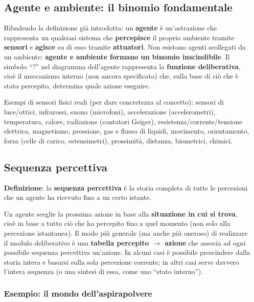 \documentclass[11pt,a4paper]{report}
\begin{document}
\subsection{Agente e ambiente: il binomio fondamentale}

Ribadendo la definizione già introdotta: un \textbf{agente} è un'astrazione che rappresenta un qualsiasi sistema che \textbf{percepisce} il proprio ambiente tramite \textbf{sensori} e \textbf{agisce} su di esso tramite \textbf{attuatori}. Non esistono agenti scollegati da un ambiente: \textbf{agente e ambiente formano un binomio inscindibile}. Il simbolo ``?'' nel diagramma dell'agente rappresenta la \textbf{funzione deliberativa}, cioè il meccanismo interno (non ancora specificato) che, sulla base di ciò che è stato percepito, determina quale azione eseguire.

Esempi di sensori fisici reali (per dare concretezza al concetto): sensori di luce/ottici, infrarossi, suono (microfoni), accelerazione (accelerometri), temperatura, calore, radiazione (contatori Geiger), resistenza/corrente/tensione elettrica, magnetismo, pressione, gas e flusso di liquidi, movimento, orientamento, forza (celle di carico, estensimetri), prossimità, distanza, biometrici, chimici.

\subsection{Sequenza percettiva}

\textbf{Definizione}: la \textbf{sequenza percettiva} è la storia completa di tutte le percezioni che un agente ha ricevuto fino a un certo istante.

Un agente sceglie la prossima azione in base alla \textbf{situazione in cui si trova}, cioè in base a tutto ciò che ha percepito fino a quel momento (non solo alla percezione istantanea). Il modo più generale (ma anche più oneroso) di realizzare il modulo deliberativo è una \textbf{tabella percepito $\to$ azione} che associa ad ogni possibile sequenza percettiva un'azione. In alcuni casi è possibile prescindere dalla storia intera e basarsi sulla sola percezione corrente; in altri casi serve davvero l'intera sequenza (o una sintesi di essa, come uno ``stato interno'').

\subsubsection*{Esempio: il mondo dell'aspirapolvere}
\end{document}
